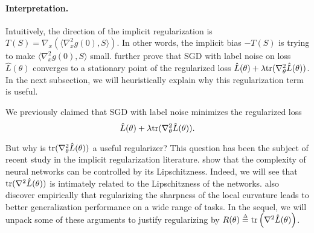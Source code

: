 \paragraph{Interpretation.} Intuitively, the direction of the implicit regularization is $T(S) = \nabla_x \left(\langle\nabla_x^2g(0), S\rangle\right)$. In other words, the implicit bias $-T(S)$ is trying to make $\langle\nabla^2_x g(0), S\rangle$ small. \cite{damian2021label} further prove that SGD with label noise on loss $\hat{L}(\theta)$ converges to a stationary point of the regularized loss $\hat{L}(\theta) + \lambda \textup{tr}(\nabla^2_\theta \hat{L}(\theta))$. In the next subsection, we will heuristically explain why this regularization term is useful.

We previously claimed that SGD with label noise minimizes the regularized loss 
\begin{equation}
    \hat{L}(\theta) + \lambda \textup{tr}(\nabla^2_\theta \hat{L}(\theta)).
\end{equation} 

But why is $\textup{tr}(\nabla^2_\theta \hat{L}(\theta))$ a useful regularizer? This question has been the subject of recent study in the implicit regularization literature. \cite{wei2019improved} show that the complexity of neural networks can be controlled by its Lipschitzness. Indeed, we will see that $\textup{tr}(\nabla^2\hat{L}(\theta))$ is intimately related to the Lipschitzness of the networks. \cite{foret2020sharpness} also discover empirically that regularizing the sharpness of the local curvature leads to better generalization performance on a wide range of tasks. In the sequel, we will unpack some of these arguments to justify regularizing by $R(\theta) \defeq \textup{tr}\left (\nabla^2 \hat{L}(\theta) \right )$.

